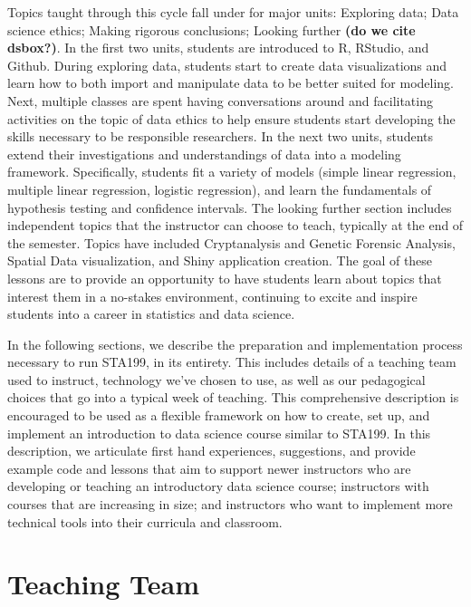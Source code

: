 \documentclass[
  12pt]{article}
\begin{document}
Topics taught through this cycle fall under for major units: Exploring
data; Data science ethics; Making rigorous conclusions; Looking further
\textbf{(do we cite dsbox?)}. In the first two units, students are
introduced to R, RStudio, and Github. During exploring data, students
start to create data visualizations and learn how to both import and
manipulate data to be better suited for modeling. Next, multiple classes
are spent having conversations around and facilitating activities on the
topic of data ethics to help ensure students start developing the skills
necessary to be responsible researchers. In the next two units, students
extend their investigations and understandings of data into a modeling
framework. Specifically, students fit a variety of models (simple linear
regression, multiple linear regression, logistic regression), and learn
the fundamentals of hypothesis testing and confidence intervals. The
looking further section includes independent topics that the instructor
can choose to teach, typically at the end of the semester. Topics have
included Cryptanalysis and Genetic Forensic Analysis, Spatial Data
visualization, and Shiny application creation. The goal of these lessons
are to provide an opportunity to have students learn about topics that
interest them in a no-stakes environment, continuing to excite and
inspire students into a career in statistics and data science.

In the following sections, we describe the preparation and
implementation process necessary to run STA199, in its entirety. This
includes details of a teaching team used to instruct, technology we've
chosen to use, as well as our pedagogical choices that go into a typical
week of teaching. This comprehensive description is encouraged to be
used as a flexible framework on how to create, set up, and implement an
introduction to data science course similar to STA199. In this
description, we articulate first hand experiences, suggestions, and
provide example code and lessons that aim to support newer instructors
who are developing or teaching an introductory data science course;
instructors with courses that are increasing in size; and instructors
who want to implement more technical tools into their curricula and
classroom.

\hypertarget{teaching-team}{%
\section{Teaching Team}\label{teaching-team}}
\end{document}
